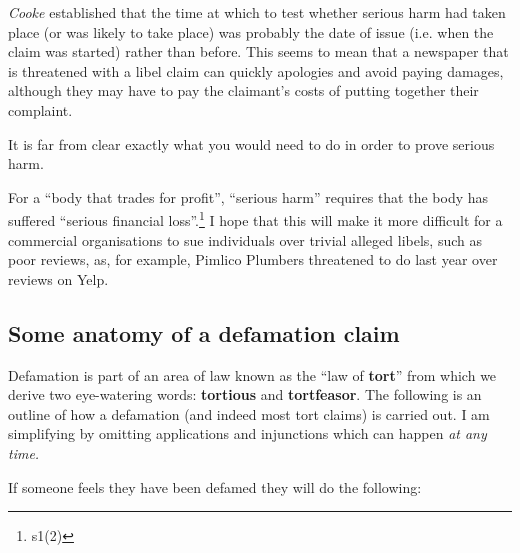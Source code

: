 \documentclass[]{article}
\begin{document}
{\it Cooke} established that the time at which to test whether serious harm had taken place (or was likely to take place) was probably the date of issue (i.e. when the claim was started) rather than before. This seems to mean that a newspaper that is threatened with a libel claim can quickly apologies and avoid paying damages, although they may have to pay the claimant's costs of putting together their complaint.

It is far from clear exactly what you would need to do in order to prove serious harm.

For a ``body that trades for profit'', ``serious harm'' requires that the body has suffered ``serious financial loss''.\footnote{s1(2)} I hope that this will make it more difficult for a commercial organisations to sue individuals over trivial alleged libels, such as poor reviews, as, for example, Pimlico Plumbers threatened to do last year over reviews on Yelp.

\subsection{Some anatomy of a defamation claim}

Defamation is part of an area of law known as the ``law of
\textbf{tort}{'' from which we derive two eye-watering words:
}\textbf{tortious} {and }\textbf{tortfeasor}{. The following is an
outline of how a defamation (and indeed most tort claims) is carried
out. I am simplifying by omitting applications and injunctions which can
happen }\emph{{at any time.}}

If someone feels they have been defamed they will do the following:
\end{document}
